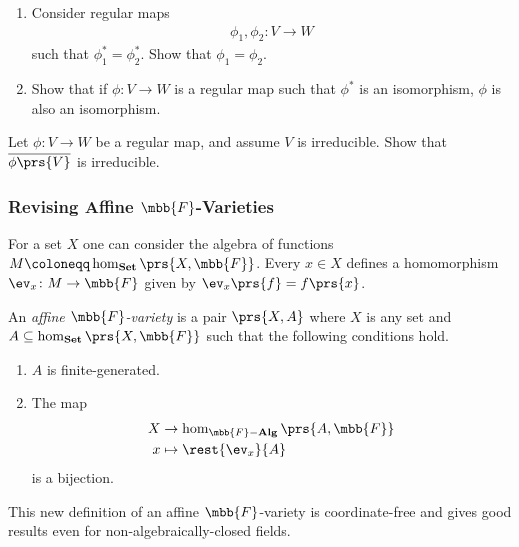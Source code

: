 \documentclass[10pt,a4paper,twoside,openany,hidelinks]{book}
\begin{document}
\begin{exercise}
\begin{enumerate}
\item Consider regular maps
\begin{align*}
\phi_1,\phi_2 \colon V \to W
\end{align*}
such that $\phi_1^* = \phi_2^*$. Show that $\phi_1 = \phi_2$.

\item Show that if $\phi \colon V \to W$ is a regular map such that $\phi^*$ is an isomorphism, $\phi$ is also an isomorphism.
\end{enumerate}
\end{exercise}

\begin{exercise}
Let $\phi \colon V \to W$ be a regular map, and assume $V$ is irreducible. Show that $\overline{\phi\prs{V}}$ is irreducible. 
\end{exercise}

\subsubsection{Revising Affine $\mbb{F}$-Varieties}

For a set $X$ one can consider the algebra of functions $M \coloneqq \hom_{\mathbf{Set}}\prs{X,\mbb{F}}$. Every $x \in X$ defines a homomorphism $\ev_x \colon M \to \mbb{F}$ given by $\ev_x\prs{f} = f\prs{x}$.

\begin{definition}
An \emph{affine $\mbb{F}$-variety} is a pair $\prs{X,A}$ where $X$ is any set and $A \subseteq \hom_{\mathbf{Set}}\prs{X,\mbb{F}}$ such that the following conditions hold.

\begin{enumerate}
\item $A$ is finite-generated.
\item The map
\begin{align*}
X &\to \hom_{\mbb{F}\mathbf{-Alg}}\prs{A, \mbb{F}} \\
x &\mapsto \rest{\ev_x}{A}
\end{align*}
is a bijection.
\end{enumerate}
\end{definition}


\begin{remark}
This new definition of an affine $\mbb{F}$-variety is coordinate-free and gives good results even for non-algebraically-closed fields.
\end{remark}
\end{document}
